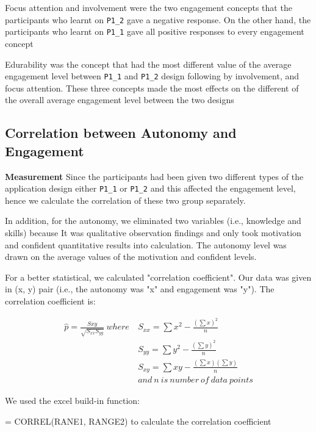 \begin{itemize}
Focus attention and involvement were the two engagement concepts that the participants who learnt on \verb|P1_2| gave a negative response. On the other hand, the participants who learnt on \verb|P1_1| gave all positive responses to every engagement concept

Edurability was the concept that had the most different value of the average engagement level between \verb|P1_1| and \verb|P1_2| design following by involvement, and focus attention. These three concepts made the most effects on the different of the overall average engagement level between the two designs

\end{itemize}




\newpage 
\subsection{Correlation between Autonomy and Engagement}
\noindent\textbf{Measurement} 
\newline
Since the participants had been given two different types of the application design either \verb|P1_1| or \verb|P1_2| and this affected the engagement level, hence we calculate the correlation of these two group separately. 

In addition, for the autonomy, we eliminated two variables (i.e., knowledge and skills) because It was qualitative observation findings and only took motivation and confident quantitative results into calculation. The autonomy level was drawn on the average values of the motivation and confident levels. 

For a better statistical, we calculated "correlation coefficient". Our data was given in (x, y) pair (i.e., the autonomy was "x" and engagement was "y"). The correlation coefficient is: 

\begin{align*}
\hat p=\frac{S{xy}}{\sqrt{S_{xx}S_{yy}}} \ where \ &S_{xx} = \sum{x^2}- \frac{{(\sum x)}^2}n\\ 
&S_{yy} = \sum{y^2}- \frac{{(\sum y)}^2}n\\
&S_{xy} = \sum{xy}- \frac{(\sum x)(\sum y)}n\\
&and \ n \ is \ number \ of \ data \ points 
\end{align*}

We used the excel build-in function: 

= CORREL(RANE1, RANGE2) to calculate the correlation coefficient 

